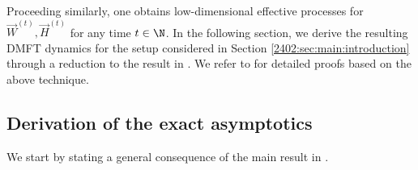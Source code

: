 Proceeding similarly, one obtains low-dimensional effective processes for $\vec{W}^{(t)},\vec{H}^{(t)}$ for any time $t \in \N$.  In the following section, we derive the resulting DMFT dynamics for the setup considered in Section \ref{2402:sec:main:introduction} through a reduction to the result in \citep{gerbelot2022rigorous}. We refer to \citep{gerbelot2022rigorous,celentano2021high} for detailed proofs based on the above technique.






\subsection{Derivation of the exact asymptotics}



We start by stating a general consequence of the main result in \citep{gerbelot2022rigorous}.

